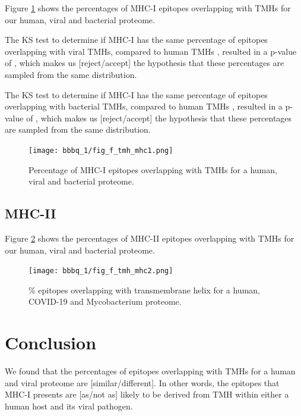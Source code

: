 Figure \ref{fig:1} shows the percentages of MHC-I epitopes overlapping 
with TMHs for our human, viral and bacterial proteome.

The KS test to determine if MHC-I has the same percentage 
of epitopes overlapping with viral TMHs, 
compared to human TMHs ,
resulted in a p-value of ,
which makes us [reject/accept] the hypothesis that these percentages
are sampled from the same distribution. 

The KS test to determine if MHC-I has the same percentage 
of epitopes overlapping with bacterial TMHs, 
compared to human TMHs ,
resulted in a p-value of ,
which makes us [reject/accept] the hypothesis that these percentages
are sampled from the same distribution. 

\begin{figure}[!htbp]
  \texttt{[image: bbbq\_1/fig\_f\_tmh\_mhc1.png]}
  \caption{
    Percentage of MHC-I epitopes overlapping with TMHs
    for a human, viral and bacterial proteome.
  }
  \label{fig:1}
\end{figure}

\subsection{MHC-II}

Figure \ref{fig:2} shows the percentages of MHC-II epitopes overlapping 
with TMHs for our human, viral and bacterial proteome.

\begin{figure}[!htbp]
  \texttt{[image: bbbq\_1/fig\_f\_tmh\_mhc2.png]}
  \caption{
    \% epitopes overlapping with transmembrane helix
    for a human, COVID-19 and Mycobacterium proteome.
  }
  \label{fig:2}
\end{figure}

\section{Conclusion}

We found that the percentages of epitopes overlapping 
with TMHs for a human and viral proteome are 
[similar/different]. In other words, the
epitopes that MHC-I presents are [as/not as] likely 
to be derived from TMH within either a human host and its viral pathogen.

